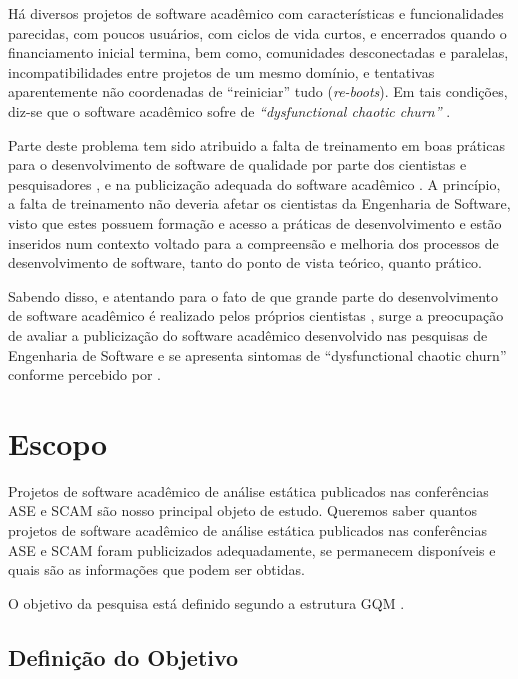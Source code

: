 Há diversos projetos de software acadêmico com características e
funcionalidades parecidas, com poucos usuários, com ciclos de vida curtos, e
encerrados quando o financiamento inicial termina, bem como, comunidades
desconectadas e paralelas, incompatibilidades entre projetos de um mesmo
domínio, e tentativas aparentemente não coordenadas de ``reiniciar'' tudo ({\it re-boots}).
Em tais condições, diz-se que o software acadêmico sofre de 
{\it ``dysfunctional chaotic churn''} \cite{howison2015understanding}.

Parte deste problema tem sido atribuido a falta de treinamento em boas práticas
para o desenvolvimento de software de qualidade por parte dos cientistas e pesquisadores
\cite{wilson2017good}, 
e na publicização adequada do software acadêmico \cite{allen2017engineering}.
A princípio, a falta de treinamento não deveria afetar os cientistas da
Engenharia de Software, visto que estes possuem formação e acesso a práticas de
desenvolvimento e estão inseridos num contexto voltado para a compreensão e
melhoria dos processos de desenvolvimento de software, tanto do ponto de vista
teórico, quanto prático.

Sabendo disso, e atentando para o fato de que grande parte do desenvolvimento
de software acadêmico é realizado pelos próprios cientistas
\cite{hettrick2014uk, momcheva2015software}, surge a preocupação de avaliar 
a publicização do software acadêmico desenvolvido nas pesquisas de Engenharia de
Software e se apresenta sintomas de ``dysfunctional chaotic churn'' conforme
percebido por .


\section{Escopo} \label{estudo1:escopo} %

Projetos de software acadêmico de análise estática publicados nas 
conferências ASE e SCAM 
são nosso principal objeto de estudo.
Queremos saber quantos projetos de software acadêmico de análise estática publicados
nas conferências ASE e SCAM foram publicizados adequadamente, se permanecem disponíveis e 
quais são as informações que podem ser obtidas.

O objetivo da pesquisa está definido segundo a estrutura GQM \cite{basili1994goal}.

\subsection{Definição do Objetivo}

